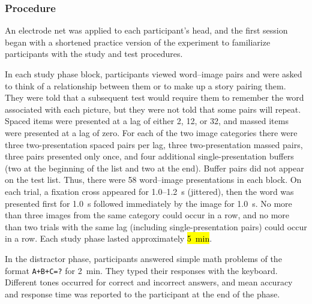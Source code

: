 \subsubsection{Procedure}

An electrode net was applied to each participant's head, and the first session began with a shortened practice version of the experiment to familiarize participants with the study and test procedures.




In each study phase block, participants viewed word--image pairs and were asked to think of a relationship between them or to make up a story pairing them.  They were told that a subsequent test would require them to remember the word associated with each picture, but they were not told that some pairs will repeat.  Spaced items were presented at a lag of either 2, 12, or 32, and massed items were presented at a lag of zero.  For each of the two image categories there were three two-presentation spaced pairs per lag, three two-presentation massed pairs, three pairs presented only once, and four additional single-presentation buffers (two at the beginning of the list and two at the end).  Buffer pairs did not appear on the test list.
Thus, there were 58 word--image presentations in each block.  On each trial, a fixation cross appeared for 1.0--1.2~s (jittered), then the word was presented first for 1.0~s followed immediately by the image for 1.0~s.  No more than three images from the same category could occur in a row, and no more than two trials with the same lag (including single-presentation pairs) could occur in a row.  Each study phase lasted approximately \hl{5~min}.

In the distractor phase, participants answered simple math problems of the format \texttt{A+B+C=?} for 2~min.  They typed their responses with the keyboard.  Different tones occurred for correct and incorrect answers, and mean accuracy and response time was reported to the participant at the end of the phase.

